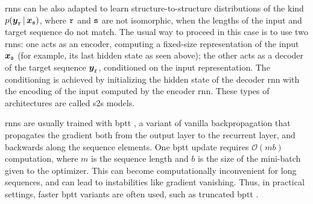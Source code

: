 \glspl{rnn} can be also adapted to learn structure-to-structure distributions of the kind $p(\Vector{y}_{\Seq{r}} \given \Vector{x}_{\Seq{s}})$, where $\mathtt{r}$ and $\mathtt{s}$ are not isomorphic, \ie when the lengths of the input and target sequence do not match. The usual way to proceed in this case is to use two \glspl{rnn}: one acts as an encoder, computing a fixed-size representation of the input $\Vector{x}_{\Seq{s}}$ (for example, its last hidden state as seen above); the other acts as a decoder of the target sequence $\Vector{y}_{\Seq{r}}$, conditioned on the input representation. The conditioning is achieved by initializing the hidden state of the decoder \gls{rnn} with the encoding of the input computed by the encoder \gls{rnn}. These types of architectures are called \gls{s2s} models.

\glspl{rnn} are usually trained with \gls{bptt} \citep{werbos1988backpropthroughtime}, a variant of vanilla backpropagation that propagates the gradient both from the output layer to the recurrent layer, and backwards along the sequence elements. One \gls{bptt} update requires $\mathcal{O}(mb)$ computation, where $m$ is the sequence length and $b$ is the size of the mini-batch given to the optimizer. This can become computationally inconvenient for long sequences, and can lead to instabilities like gradient vanishing. Thus, in practical settings, faster \gls{bptt} variants are often used, such as truncated \gls{bptt} \citep{jaeger2002truncatedbptt}.

